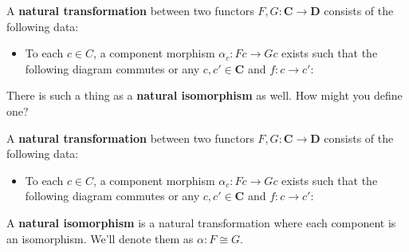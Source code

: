 \documentclass[tikz]{beamer}
\theoremstyle{definition}
\begin{document}
\begin{frame}[fragile]

    \begin{definition}
        A \textbf{natural transformation} between two functors $F,G: \mathbf{C} \to \mathbf{D}$ consists of the following data:

        \begin{itemize}
            \item To each $c \in C$, a component morphism $\alpha_c : Fc \to Gc$ exists such that the following diagram commutes or any $c, c' \in \mathbf{C}$ and $f: c \to c'$:
            \begin{center}
                {}
            \end{center}{}
        \end{itemize}

    \end{definition}{}

 There is such a thing as a \textbf{natural isomorphism} as well. How might you define one?
\end{frame}

\begin{frame}[fragile]

    \begin{definition}
        A \textbf{natural transformation} between two functors $F,G: \mathbf{C} \to \mathbf{D}$ consists of the following data:

        \begin{itemize}
            \item To each $c \in C$, a component morphism $\alpha_c : Fc \to Gc$ exists such that the following diagram commutes or any $c, c' \in \mathbf{C}$ and $f: c \to c'$:
            \begin{center}
                {}
            \end{center}{}
        \end{itemize}

    \end{definition}

    \begin{definition}
      A \textbf{natural isomorphism} is a natural transformation where each component is an isomorphism. We'll denote them as $\alpha: F \cong G$.
    \end{definition}
\end{frame}
\end{document}
